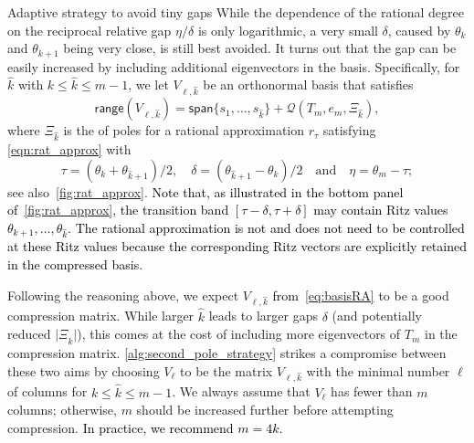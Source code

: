 \documentclass{siamart190516}
\newcommand{\range}{\mathsf{range}}
\providecommand{\spa}[1]{\mathsf{span}\{#1\}}
\providecommand{\abs}[1]{\lvert#1\rvert}
\providecommand{\edit}[1]{\textcolor{black}{#1}}
\begin{document}
\begin{paragraph}{Adaptive strategy to avoid tiny gaps}
While the dependence of the rational degree on the reciprocal relative gap $\eta/\delta$ is only logarithmic, a very small $\delta$, caused by 
$\theta_{k}$ and $\theta_{k+1}$ being very close, is still best avoided. It turns out that the gap can be easily increased by including additional eigenvectors in the basis.
Specifically, for $\widehat{k}$ with $k\leq \widehat{k}\leq m-1$, we let $V_{\ell,\widehat{k}}$ be an orthonormal basis that satisfies
\begin{equation}
    \label{eq:basisRA}
    \range(V_{\ell,\widehat{k}}) = \spa{s_{1},\dotsc,s_{\widehat{k}}}+\mathcal{Q}(T_{m},e_m,\Xi_{\widehat{k}}),
\end{equation}
where $\Xi_{\widehat{k}}$ is the of poles for a rational approximation $r_{\tau}$ satisfying \cref{eqn:rat_approx} with 
\begin{equation}
    \label{eq:paraRA}
    \tau = (\theta_k + \theta_{\widehat{k}+1}) / 2,\quad  \delta = (\theta_{\widehat{k}+1} - \theta_k) / 2 \quad\text{and}\quad \eta = \theta_m - \tau;
\end{equation}
see also~\cref{fig:rat_approx}.
\edit{Note that, as illustrated in the bottom panel of~\cref{fig:rat_approx}, the transition band $[\tau-\delta,\tau+\delta]$ may contain Ritz values $\theta_{k+1},\ldots,\theta_{\hat k}$. 
The rational approximation is not and does not need to be controlled at these Ritz values because the corresponding Ritz vectors are explicitly retained in the compressed basis.
}

Following the reasoning above, we expect $V_{\ell,\widehat{k}}$ \edit{from~\cref{eq:basisRA}} to be a good compression matrix.
While larger $\widehat{k}$ leads to larger gaps $\delta$ (and potentially reduced $\abs{\Xi_{\widehat{k}}}$), this comes at the cost of including more eigenvectors of $T_m$ in the compression matrix. \cref{alg:second_pole_strategy} strikes a compromise between these two aims by choosing $V_{\ell}$ to be the matrix $V_{\ell,\widehat{k}}$ with the minimal number $\ell$ of columns for $k\leq \widehat{k}\leq m-1$. We always assume that $V_{\ell}$ has fewer than $m$ columns; otherwise, $m$ should be increased further before attempting compression. \edit{In practice, we recommend $m=4k$.}


\end{paragraph}
\end{document}
